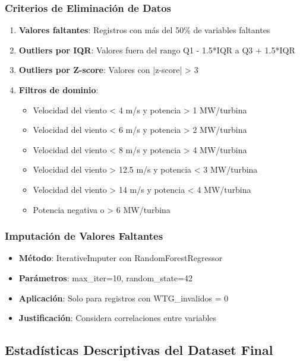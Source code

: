 \documentclass[conference]{IEEEtran}
\begin{document}
	\subsubsection{Criterios de Eliminación de Datos}
	\begin{enumerate}[leftmargin=*]
		\item \textbf{Valores faltantes}: Registros con más del 50\% de variables faltantes
		\item \textbf{Outliers por IQR}: Valores fuera del rango Q1 - 1.5*IQR a Q3 + 1.5*IQR
		\item \textbf{Outliers por Z-score}: Valores con |z-score| > 3
		\item \textbf{Filtros de dominio}:
		\begin{itemize}
			\item Velocidad del viento < 4 m/s y potencia > 1 MW/turbina
			\item Velocidad del viento < 6 m/s y potencia > 2 MW/turbina
			\item Velocidad del viento < 8 m/s y potencia > 4 MW/turbina
			\item Velocidad del viento > 12.5 m/s y potencia < 3 MW/turbina
			\item Velocidad del viento > 14 m/s y potencia < 4 MW/turbina
			\item Potencia negativa o > 6 MW/turbina
		\end{itemize}
	\end{enumerate}
	
	\subsubsection{Imputación de Valores Faltantes}
	\begin{itemize}[leftmargin=*]
		\item \textbf{Método}: IterativeImputer con RandomForestRegressor
		\item \textbf{Parámetros}: max\_iter=10, random\_state=42
		\item \textbf{Aplicación}: Solo para registros con WTG\_invalidos = 0
		\item \textbf{Justificación}: Considera correlaciones entre variables
	\end{itemize}
	
	\subsection{Estadísticas Descriptivas del Dataset Final}
	
\end{document}
